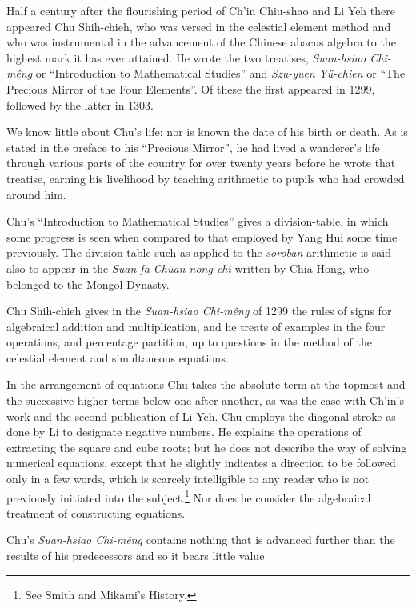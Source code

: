 \documentclass[11pt]{article}
\newcommand{\scanfooter}{}
\begin{document}
Half a century after the flourishing period of Ch'in Chiu-shao and Li Yeh there appeared Chu Shih-chieh, who was versed in the celestial element method and who was instrumental in the advancement of the Chinese abacus algebra to the highest mark it has ever attained. He wrote the two treatises, \emph{Suan-hsiao Chi-mêng} or ``Introduction to Mathematical Studies'' and \emph{Szu-yuen Yü-chien} or ``The Precious Mirror of the Four Elements''. Of these the first appeared in 1299, followed by the latter in 1303.

We know little about Chu's life; nor is known the date of his birth or death. As is stated in the preface to his ``Precious Mirror'', he had lived a wanderer's life through various parts of the country for over twenty years before he wrote that treatise, earning his livelihood by teaching arithmetic to pupils who had crowded around him.

Chu's ``Introduction to Mathematical Studies'' gives a division-table, in which some progress is seen when compared to that employed by Yang Hui some time previously. The division-table such as applied to the \emph{soroban} arithmetic is said also to appear in the \emph{Suan-fa Chüan-nong-chi} written by Chia Hong, who belonged to the Mongol Dynasty.

Chu Shih-chieh gives in the \emph{Suan-hsiao Chi-mêng} of 1299 the rules of signs for algebraical addition and multiplication, and he treats of examples in the four operations, and percentage partition, up to questions in the method of the celestial element and simultaneous equations.

In the arrangement of equations Chu takes the absolute term at the topmost and the successive higher terms below one after another, as was the case with Ch'in's work and the second publication of Li Yeh. Chu employs the diagonal stroke as done by Li to designate negative numbers. He explains the operations of extracting the square and cube roots; but he does not describe the way of solving numerical equations, except that he slightly indicates a direction to be followed only in a few words, which is scarcely intelligible to any reader who is not previously initiated into the subject.\footnote{See Smith and Mikami's History.} Nor does he consider the algebraical treatment of constructing equations.

Chu's \emph{Suan-hsiao Chi-mêng} contains nothing that is advanced further than the results of his predecessors and so it bears little value
\scanfooter
\end{document}
